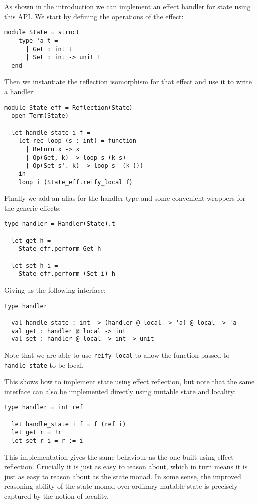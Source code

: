 \documentclass[acmsmall, screen, review, anonymous]{acmart}
\theoremstyle{definition}
\begin{document}
As shown in the introduction we can implement an effect handler for
state using this API. We start by defining the operations of the effect:
\begin{lstlisting}[style=oxcaml]
  module State = struct
    type 'a t =
      | Get : int t
      | Set : int -> unit t
  end
\end{lstlisting}
Then we instantiate the reflection isomorphism for that effect and use
it to write a handler:
\begin{lstlisting}[style=oxcaml]
  module State_eff = Reflection(State)
  open Term(State)

  let handle_state i f =
    let rec loop (s : int) = function
      | Return x -> x
      | Op(Get, k) -> loop s (k s)
      | Op(Set s', k) -> loop s' (k ())
    in
    loop i (State_eff.reify_local f)
\end{lstlisting}
Finally we add an alias for the handler type and some convenient
wrappers for the generic effects:
\begin{lstlisting}[style=oxcaml]
  type handler = Handler(State).t

  let get h =
    State_eff.perform Get h

  let set h i =
    State_eff.perform (Set i) h
\end{lstlisting}
Giving us the following interface:
\begin{lstlisting}[style=oxcaml]
  type handler

  val handle_state : int -> (handler @ local -> 'a) @ local -> 'a
  val get : handler @ local -> int
  val set : handler @ local -> int -> unit
\end{lstlisting}
Note that we are able to use \lstinline[style=oxcaml]{reify_local} to allow
the function passed to \lstinline[style=oxcaml]{handle_state} to be local.

This shows how to implement state using effect reflection, but note that
the same interface can also be implemented directly using mutable state
and locality:
\begin{lstlisting}[style=oxcaml]
  type handler = int ref

  let handle_state i f = f (ref i)
  let get r = !r
  let set r i = r := i
\end{lstlisting}
This implementation gives the same behaviour as the one built using
effect reflection. Crucially it is just as easy to reason about, which
in turn means it is just as easy to reason about as the state monad. In
some sense, the improved reasoning ability of the state monad over
ordinary mutable state is precisely captured by the notion of locality.
\end{document}
